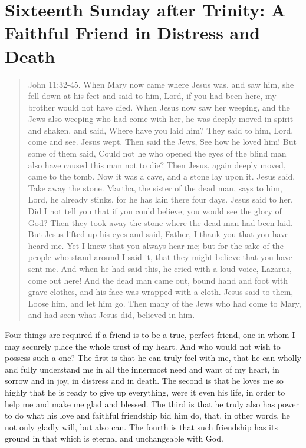 

\section{Sixteenth Sunday after Trinity: A Faithful Friend in Distress and Death}


\begin{quote}

John 11:32-45. When Mary now came where Jesus was, and saw him, she fell down at his feet and said to him, Lord, if you had been here, my brother would not have died. When Jesus now saw her weeping, and the Jews also weeping who had come with her, he was deeply moved in spirit and shaken, and said, Where have you laid him? They said to him, Lord, come and see. Jesus wept. Then said the Jews, See how he loved him! But some of them said, Could not he who opened the eyes of the blind man also have caused this man not to die? Then Jesus, again deeply moved, came to the tomb. Now it was a cave, and a stone lay upon it. Jesus said, Take away the stone. Martha, the sister of the dead man, says to him, Lord, he already stinks, for he has lain there four days. Jesus said to her, Did I not tell you that if you could believe, you would see the glory of God? Then they took away the stone where the dead man had been laid. But Jesus lifted up his eyes and said, Father, I thank you that you have heard me. Yet I knew that you always hear me; but for the sake of the people who stand around I said it, that they might believe that you have sent me. And when he had said this, he cried with a loud voice, Lazarus, come out here! And the dead man came out, bound hand and foot with grave-clothes, and his face was wrapped with a cloth. Jesus said to them, Loose him, and let him go. Then many of the Jews who had come to Mary, and had seen what Jesus did, believed in him.

\end{quote}

\bigskip

Four things are required if a friend is to be a true, perfect friend, one in whom I may securely place the whole trust of my heart. And who would not wish to possess such a one? The first is that he can truly feel with me, that he can wholly and fully understand me in all the innermost need and want of my heart, in sorrow and in joy, in distress and in death. The second is that he loves me so highly that he is ready to give up everything, were it even his life, in order to help me and make me glad and blessed. The third is that he truly also has power to do what his love and faithful friendship bid him do, that, in other words, he not only gladly will, but also can. The fourth is that such friendship has its ground in that which is eternal and unchangeable with God.

